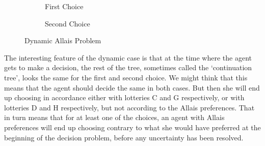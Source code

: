 \begin{figure}[ht]
    \begin{subfigure}[b]{0.52\textwidth}
        \caption{First Choice}
        \label{subf11}
    \end{subfigure}
    \begin{subfigure}[b]{0.48\textwidth}
        \caption{Second Choice}
        \label{subf12}
    \end{subfigure}
\caption{Dynamic Allais Problem}
\label{f1}
\end{figure}

The interesting feature of the dynamic case is that at the time where the agent gets to make a decision, the rest of the tree, sometimes called the `continuation tree', looks the same for the first and second choice. We might think that this means that the agent should decide the same in both cases. But then she will end up choosing in accordance either with lotteries C and G respectively, or with lotteries D and H respectively, but not according to the Allais preferences. That in turn means that for at least one of the choices, an agent with Allais preferences will end up choosing contrary to what she would have preferred at the beginning of the decision problem, before any uncertainty has been resolved.

